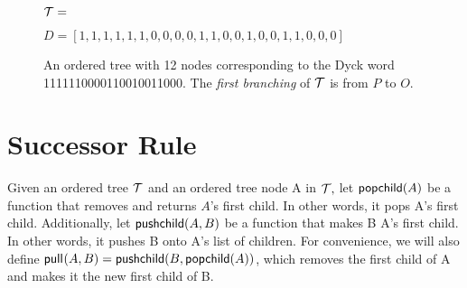 

\begin{figure}
    \centering
    $\mathcal{T}=$


    $D=[1, 1, 1, 1, 1, 1, 0, 0, 0, 0, 1, 1, 0, 0, 1, 0, 0, 1, 1, 0, 0, 0]$
    \caption{An ordered tree with 12 nodes corresponding to the Dyck word 1111110000110010011000.  The \emph{first branching} of $\mathcal{T}$ is from $P$ to $O$.}
    \label{fig:exampleotree}
\end{figure}


\section{Successor Rule} \label{sec:otree-successor}

Given an ordered tree $\mathcal{T}$ and an ordered tree node A in $\mathcal{T},$ let $\mathsf{popchild(} A \mathsf{)}$ be a function that removes and returns $A$'s first child.  In other words, it pops A's first child.  Additionally, let $\mathsf{pushchild(} A, B \mathsf{)}$ be a function that makes B A's first child.  In other words, it pushes B onto A's list of children. 
For convenience, we will also define $\mathsf{pull}_{}(A,B)=\mathsf{pushchild(} B, \mathsf{popchild(} A \mathsf{)} \mathsf{)}$, which removes the first child of A and makes it the new first child of B.

